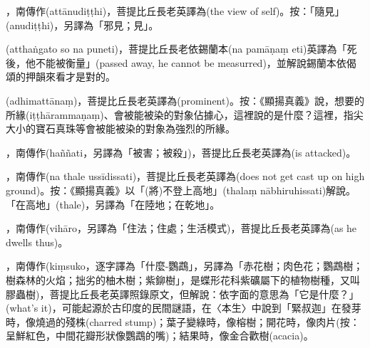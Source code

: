 \startitemgroup[noteitems]
\item{}，南傳作(attānudiṭṭhi)，菩提比丘長老英譯為(the view of self)。按：「隨見」(anudiṭṭhi)，另譯為「邪見；見」。
\stopitemgroup

\startitemgroup[noteitems]
\item{}(atthaṅgato so na puneti)，菩提比丘長老依錫蘭本(na pamāṇaṃ eti)英譯為「死後，他不能被衡量」(passed away, he cannot be measurred)，並解說錫蘭本依偈頌的押韻來看才是對的。
\stopitemgroup

\startitemgroup[noteitems]
\item{}(adhimattānaṃ)，菩提比丘長老英譯為(prominent)。按：《顯揚真義》說，想要的所緣(iṭṭhārammaṇaṃ)、會被能被染的對象佔據心，這裡說的是什麼？這裡，指尖大小的寶石真珠等會被能被染的對象為強烈的所緣。
\stopitemgroup

\startitemgroup[noteitems]
\item{}，南傳作(haññati，另譯為「被害；被殺」)，菩提比丘長老英譯為(is attacked)。
\stopitemgroup

\startitemgroup[noteitems]
\item{}，南傳作(na thale ussīdissati)，菩提比丘長老英譯為(does not get cast up on high ground)。按：《顯揚真義》以「(將)不登上高地」(thalaṃ nābhiruhissati)解說。「在高地」(thale)，另譯為「在陸地；在乾地」。
\stopitemgroup

\startitemgroup[noteitems]
\item{}，南傳作(vihāro，另譯為「住法；住處；生活模式)，菩提比丘長老英譯為(as he dwells thus)。
\stopitemgroup

\startitemgroup[noteitems]
\item{}，南傳作(kiṃsuko，逐字譯為「什麼-鸚鵡」，另譯為「赤花樹；肉色花；鸚鵡樹；樹森林的火焰；拙劣的柚木樹；紫鉚樹」，是蝶形花科紫礦屬下的植物樹種，又叫膠蟲樹)，菩提比丘長老英譯照錄原文，但解說：依字面的意思為「它是什麼？」(what's it)，可能起源於古印度的民間謎語，在〈本生〉中說到「緊叔迦」在發芽時，像燒過的殘株(charred stump)；葉子變綠時，像榕樹；開花時，像肉片(按：呈鮮紅色，中間花瓣形狀像鸚鵡的嘴)；結果時，像金合歡樹(acacia)。
\stopitemgroup

